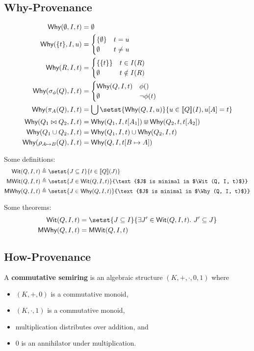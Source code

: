 \documentclass{mwhittaker}
\begin{document}
\subsection{Why-Provenance}
\begin{align*}
  \Why(\emptyset, I, t) &= \emptyset \\
  \Why(\set{t}, I, u) &= \begin{cases}
    \set{\emptyset} & t = u \\
    \emptyset & t \neq u
  \end{cases} \\
  \Why(R, I, t) &= \begin{cases}
    \set{\set{t}} & t \in I(R) \\
    \emptyset & t \notin I(R) \\
  \end{cases} \\
  \Why(\select_\phi(Q), I, t) &= \begin{cases}
    \Why(Q, I, t) & \phi() \\
    \emptyset & \lnot \phi(t)
  \end{cases} \\
  \Why(\project_A(Q), I, t) &= \bigcup \setst{\Why(Q, I, u)}{u \in \denote{Q}(I), u[A] = t} \\
  \Why(Q_1 \join Q_2, I, t) &= \Why(Q_1, I, t[A_1]) \Cup \Why(Q_2, t, t[A_2]) \\
  \Why(Q_1 \cup Q_2, I, t) &= \Why(Q_1, I, t) \cup \Why(Q_2, I, t) \\
  \Why(\rename_{A \mapsto B}(Q), I, t) &= \Why(Q, I, t[B \mapsto A])
\end{align*}

Some definitions:
\begin{align*}
  \Wit(Q, I, t)
    &\defeq \setst{J \subseteq I}{t \in \denote{Q}(J)} \\
  \MWit(Q, I, t)
    &\defeq \setst{J \in \Wit(Q, I, t)}{\text{$J$ is minimal in $\Wit(Q, I, t)$}} \\
  \MWhy(Q, I, t)
    &\defeq \setst{J \in \Why(Q, I, t)}{\text{$J$ is minimal in $\Why(Q, I, t)$}}
\end{align*}

Some theorems:
\begin{align*}
  \Wit(Q, I, t)
    &= \setst{J \subseteq I}{\exists J' \in \Wit(Q, I, t).\ J' \subseteq J} \\
  \MWhy(Q, I, t)
    &= \MWit(Q, I, t)
\end{align*}

\subsection{How-Provenance}
A \textbf{commutative semiring} is an algebraic structure $(K, +, \cdot, 0, 1)$
where
\begin{itemize}
  \item $(K, +, 0)$ is a commutative monoid,
  \item $(K, \cdot, 1)$ is a commutative monoid,
  \item multiplication distributes over addition, and
  \item 0 is an annihilator under multiplication.
\end{itemize}
\end{document}
